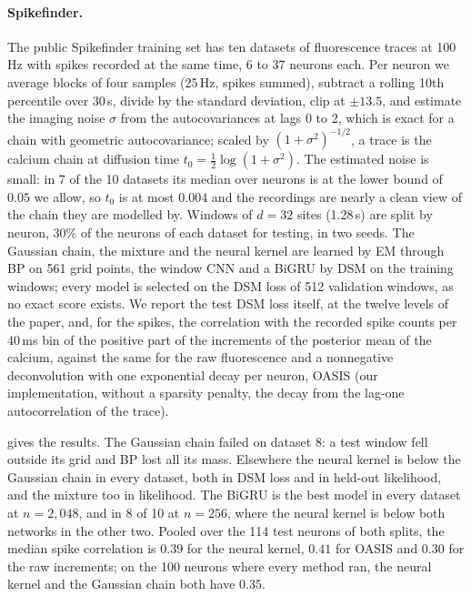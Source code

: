 \documentclass{article}
\begin{document}
\paragraph{Spikefinder.} The public Spikefinder training set \cite{berens2018community} has ten datasets of
fluorescence traces at 100\,Hz with spikes recorded at the same time, 6 to 37 neurons each. Per neuron we average blocks
of four samples (25\,Hz, spikes summed), subtract a rolling 10th percentile over 30\,s, divide by the standard
deviation, clip at $\pm13.5$, and estimate the imaging noise $\sigma$ from the autocovariances at lags 0 to 2, which is
exact for a chain with geometric autocovariance; scaled by $(1+\sigma^2)^{-1/2}$, a trace is the calcium chain at
diffusion time $t_0=\tfrac12\log(1+\sigma^2)$. The estimated noise is small: in 7 of the 10 datasets its median over
neurons is at the lower bound of $0.05$ we allow, so $t_0$ is at most $0.004$ and the recordings are nearly a clean
view of the chain they are modelled by. Windows of $d=32$ sites (1.28\,s) are split by neuron, 30\% of the neurons of
each dataset for testing, in two seeds. The Gaussian chain, the mixture and the neural kernel are learned by EM through
BP on 561 grid points, the window CNN and a BiGRU by DSM on the training windows; every model is selected on the DSM
loss of 512 validation windows, as no exact score exists. We report the test DSM loss itself, at the twelve levels of
the paper, and, for the spikes, the correlation with the recorded spike counts per 40\,ms bin of the positive part of the
increments of the posterior mean of the calcium, against the same for the raw fluorescence and a nonnegative
deconvolution with one exponential decay per neuron, OASIS \cite{friedrich2017fast} (our implementation, without a
sparsity penalty, the decay from the lag-one autocorrelation of the trace).

 gives the results. The Gaussian chain failed on dataset 8: a test window fell outside its grid
and BP lost all its mass. Elsewhere the neural kernel is below the Gaussian chain in every dataset, both in DSM loss
and in held-out likelihood, and the mixture too in likelihood. The BiGRU is the best model in every dataset at
$n=2{,}048$, and in 8 of 10 at $n=256$, where the neural kernel is below both networks in the other two. Pooled over the
114 test neurons of both splits, the median spike correlation is $0.39$ for the neural kernel, $0.41$ for OASIS and
$0.30$ for the raw increments; on the 100 neurons where every method ran, the neural kernel and the Gaussian chain both
have $0.35$.
\end{document}
